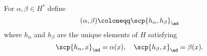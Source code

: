 For $\alpha, \beta \in H^*$ define
\[ (\alpha, \beta) \coloneqq \scp{h_\alpha, h_\beta}_{\ad} \]
where $h_\alpha$ and $h_\beta$ are the unique elements of $H$ satisfying
\[ \scp{h_\alpha, x}_{\ad} = \alpha(x),\quad \scp{h_\beta, x}_{\ad} = \beta(x). \]
